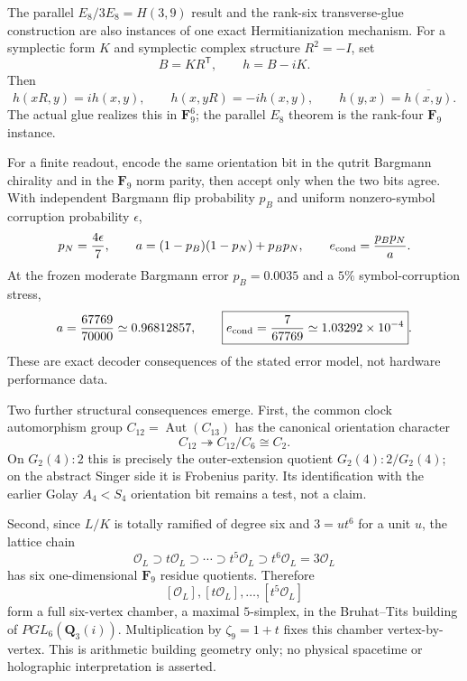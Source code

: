 The parallel $E_8/3E_8=H(3,9)$ result and the rank-six transverse-glue
construction are also instances of one exact Hermitianization mechanism.  For
a symplectic form $K$ and symplectic complex structure $R^2=-I$, set
\[
 B=KR^{\mathsf T},\qquad h=B-iK.
\]
Then
\[
 h(xR,y)=i h(x,y),\qquad h(x,yR)=-i h(x,y),\qquad
 h(y,x)=\overline{h(x,y)}.
\]
The actual glue realizes this in $\mathbf F_9^6$; the parallel $E_8$ theorem is
the rank-four $\mathbf F_9$ instance.

For a finite readout, encode the same orientation bit in the qutrit Bargmann
chirality and in the $\mathbf F_9$ norm parity, then accept only when the two
bits agree.  With independent Bargmann flip probability $p_B$ and uniform
nonzero-symbol corruption probability $\epsilon$,
\[
 p_N={4\epsilon\over7},\qquad
 a=(1-p_B)(1-p_N)+p_Bp_N,\qquad
 e_{\rm cond}={p_Bp_N\over a}.
\]
At the frozen moderate Bargmann error $p_B=0.0035$ and a $5\%$ symbol-corruption
stress,
\[
 a={67769\over70000}\simeq0.96812857,\qquad
 \boxed{e_{\rm cond}={7\over67769}\simeq1.03292\times10^{-4}}.
\]
These are exact decoder consequences of the stated error model, not hardware
performance data.

Two further structural consequences emerge.  First, the common clock
automorphism group $C_{12}=\operatorname{Aut}(C_{13})$ has the canonical
orientation character
\[
 C_{12}\twoheadrightarrow C_{12}/C_6\cong C_2.
\]
On $G_2(4){:}2$ this is precisely the outer-extension quotient
$G_2(4){:}2/G_2(4)$; on the abstract Singer side it is Frobenius parity.  Its
identification with the earlier Golay $A_4<S_4$ orientation bit remains a test,
not a claim.

Second, since $L/K$ is totally ramified of degree six and
$3=u t^6$ for a unit $u$, the lattice chain
\[
 \mathcal O_L\supset t\mathcal O_L\supset\cdots\supset
 t^5\mathcal O_L\supset t^6\mathcal O_L=3\mathcal O_L
\]
has six one-dimensional $\mathbf F_9$ residue quotients.  Therefore
\[
 [\mathcal O_L],[t\mathcal O_L],\ldots,[t^5\mathcal O_L]
\]
form a full six-vertex chamber, a maximal $5$-simplex, in the Bruhat--Tits
building of $PGL_6(\mathbf Q_3(i))$.  Multiplication by $\zeta_9=1+t$ fixes
this chamber vertex-by-vertex.  This is arithmetic building geometry only; no
physical spacetime or holographic interpretation is asserted.
